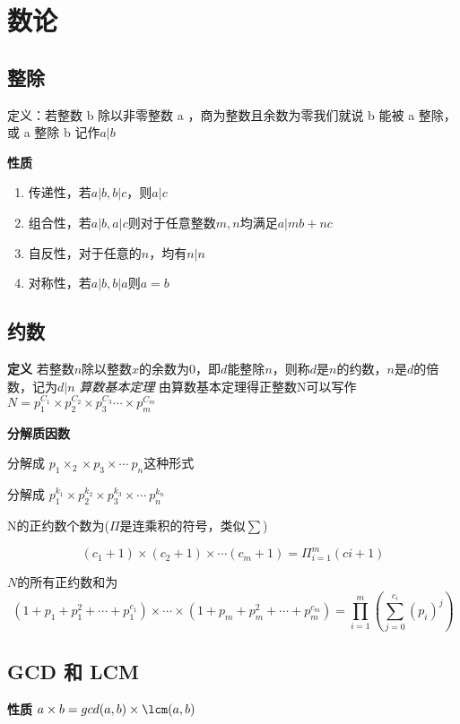 \section{数论}

\subsection{整除}

定义：若整数 b 除以非零整数 a ，商为整数且余数为零我们就说 b 能被 a 整除，或 a 整除 b 记作$a|b$

\textbf{性质}
\begin{enumerate}
    \item 传递性，若$a|b,b|c$，则$a|c$
    \item 组合性，若$a|b,a|c$则对于任意整数$m,n$均满足$a|mb+nc$
    \item 自反性，对于任意的$n$，均有$n|n$
    \item 对称性，若$a|b,b|a$则$a=b$
\end{enumerate}

\subsection{约数}
\textbf{定义}
若整数$n$除以整数$x$的余数为$0$，即$d$能整除$n$，则称$d$是$n$的约数，$n$是$d$的倍数，记为$d|n$
\emph{算数基本定理}
由算数基本定理得正整数N可以写作$N=p_1^{C_1}\times p_2^{C_2} \times p_3^{C_3} \cdots \times p_m^{C_m}$

\textbf{分解质因数}

分解成 $p_{1}\times _{2}\times p_{3}\times \cdots \ p_{n}$这种形式


分解成 $p_{1}^{k_{1}} \times p_{2}^{k_{2}} \times p_{3}^{k_{3}} \times \cdots \ p_{n}^{k_{n}}$

N的正约数个数为($\Pi$是连乘积的符号，类似$\sum$)

\[
(c_1+1)\times (c_2+1)\times \cdots (c_m+1)=\Pi_{i=1}^{m}(ci+1)
\]

$N$的所有正约数和为
\[
(1+p_1+p_1^2+\cdots +p_1^{c_1})\times\cdots\times(1+p_m+p_m^2+\cdots +p_m^{c_m})=\prod_{i=1}^{m}(\sum_{j=0}^{c_i}(p_i)^j)
\]

\subsection{ GCD 和 LCM }

\textbf{性质} $a\times b = gcd(a,b)\times\lcm(a,b)$

